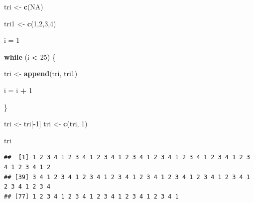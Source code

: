 \documentclass[]{article}
\newenvironment{Shaded}{\begin{snugshade}}{\end{snugshade}}
\newcommand{\ControlFlowTok}[1]{\textcolor[rgb]{0.13,0.29,0.53}{\textbf{#1}}}
\newcommand{\DecValTok}[1]{\textcolor[rgb]{0.00,0.00,0.81}{#1}}
\newcommand{\KeywordTok}[1]{\textcolor[rgb]{0.13,0.29,0.53}{\textbf{#1}}}
\newcommand{\NormalTok}[1]{#1}
\newcommand{\OperatorTok}[1]{\textcolor[rgb]{0.81,0.36,0.00}{\textbf{#1}}}
\newcommand{\OtherTok}[1]{\textcolor[rgb]{0.56,0.35,0.01}{#1}}
\newcommand{\StringTok}[1]{\textcolor[rgb]{0.31,0.60,0.02}{#1}}
\begin{document}
\begin{Shaded}
\begin{Highlighting}[]
\NormalTok{tri <-}\StringTok{ }\KeywordTok{c}\NormalTok{(}\OtherTok{NA}\NormalTok{)}

\NormalTok{tri1 <-}\StringTok{ }\KeywordTok{c}\NormalTok{(}\DecValTok{1}\NormalTok{,}\DecValTok{2}\NormalTok{,}\DecValTok{3}\NormalTok{,}\DecValTok{4}\NormalTok{)}

\NormalTok{i =}\StringTok{ }\DecValTok{1}

\ControlFlowTok{while}\NormalTok{ (i }\OperatorTok{<}\StringTok{ }\DecValTok{25}\NormalTok{) \{ }

\NormalTok{  tri <-}\StringTok{ }\KeywordTok{append}\NormalTok{(tri, tri1)}
  
\NormalTok{  i =}\StringTok{ }\NormalTok{i }\OperatorTok{+}\StringTok{ }\DecValTok{1}
  
\NormalTok{  \}}

\NormalTok{tri <-}\StringTok{ }\NormalTok{tri[}\OperatorTok{-}\DecValTok{1}\NormalTok{]}
\NormalTok{tri <-}\StringTok{ }\KeywordTok{c}\NormalTok{(tri, }\DecValTok{1}\NormalTok{)}

\NormalTok{tri}
\end{Highlighting}
\end{Shaded}

\begin{verbatim}
##  [1] 1 2 3 4 1 2 3 4 1 2 3 4 1 2 3 4 1 2 3 4 1 2 3 4 1 2 3 4 1 2 3 4 1 2 3 4 1 2
## [39] 3 4 1 2 3 4 1 2 3 4 1 2 3 4 1 2 3 4 1 2 3 4 1 2 3 4 1 2 3 4 1 2 3 4 1 2 3 4
## [77] 1 2 3 4 1 2 3 4 1 2 3 4 1 2 3 4 1 2 3 4 1
\end{verbatim}
\end{document}

